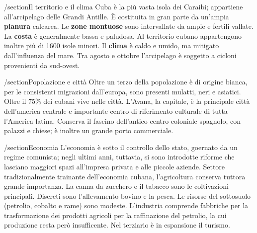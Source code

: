 /section{Il territorio e il clima}
Cuba è la più vasta isola dei Caraibi; appartiene all'arcipelago delle Grandi Antille. È costituita in gran parte da un'ampia {\bf pianura} calcarea. Le {\bf zone montuose} sono intervallate da ampie e fertili vallate. La {\bf costa} è generalmente bassa e paludosa. Al territorio cubano appartengono inoltre più di 1600 isole minori.
Il {\bf clima} è caldo e umido, ma mitigato dall'influenza del mare. Tra agosto e ottobre l'arcipelago è soggetto a cicloni provenienti da sud-ovest.

/section{Popolazione e città}
Oltre un terzo della popolazione è di origine bianca, per le consistenti migrazioni dall'europa, sono presenti mulatti, neri e asiatici.
Oltre il 75\% dei cubani vive nelle città. L'Avana, la capitale, è la principale città dell'america centrale e importante centro di riferimento culturale di tutta l'America latina. Conserva il fascino dell'antico centro coloniale spagnolo, con palazzi e chiese; è inoltre un grande porto commerciale.

/section{Economia}
L'economia è sotto il controllo dello stato, goernato da un regime comunista; negli ultimi anni, tuttavia, si sono introdotte riforme che lasciano maggiori spazi all'impresa privata e alle piccole aziende.
Settore tradizionalmente trainante dell'economia cubana, l'agricoltura conserva tuttora grande importanza. La canna da zucchero e il tabacco sono le coltivazioni principali. Discreti sono l'allevamento bovino e la pesca.
Le risorse del sottosuolo (petrolio, cobalto e rame) sono modeste.
L'industria comprende fabbriche per la trasformazione dei prodotti agricoli per la raffinazione del petrolio, la cui produzione resta però insufficente.
Nel terziario è in espansione il turismo.
